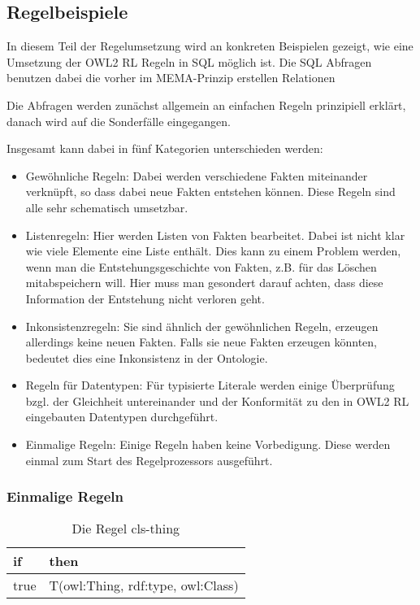 \subsection{Regelbeispiele}
\label{abschnitt-regelbeispiele}
In diesem Teil der Regelumsetzung wird an konkreten Beispielen gezeigt, wie eine Umsetzung der OWL2 RL Regeln in SQL möglich ist. Die SQL Abfragen benutzen dabei die vorher im MEMA-Prinzip erstellen Relationen

Die Abfragen werden zunächst allgemein an einfachen Regeln prinzipiell erklärt, danach wird auf die Sonderfälle eingegangen.

Insgesamt kann dabei in fünf Kategorien unterschieden werden:
\begin{itemize}
  \item Gewöhnliche Regeln: Dabei werden verschiedene Fakten miteinander verknüpft, so dass dabei neue Fakten entstehen können. Diese Regeln sind alle sehr schematisch umsetzbar.
  \item Listenregeln: Hier werden Listen von Fakten bearbeitet. Dabei ist nicht klar wie viele Elemente eine Liste enthält. Dies kann zu einem Problem werden, wenn man die Entstehungsgeschichte von Fakten, z.B. für das Löschen mitabspeichern will. Hier muss man gesondert darauf achten, dass diese Information der Entstehung nicht verloren geht.
  \item Inkonsistenzregeln: Sie sind ähnlich der gewöhnlichen Regeln, erzeugen allerdings keine neuen Fakten. Falls sie neue Fakten erzeugen könnten, bedeutet dies eine Inkonsistenz in der Ontologie.
  \item Regeln für Datentypen: Für typisierte Literale werden einige Überprüfung bzgl. der Gleichheit untereinander und der Konformität zu den in OWL2 RL eingebauten Datentypen durchgeführt.
  \item Einmalige Regeln: Einige Regeln haben keine Vorbedigung. Diese werden einmal zum Start des Regelprozessors ausgeführt.
\end{itemize}

\subsubsection{Einmalige Regeln}

\begin{table}[htb]
\begin{center}
	\begin{tabular}{l|l}
	if & then \\ \hline
	true & T(owl:Thing, rdf:type, owl:Class)
	\end{tabular}
\end{center}
	\caption{Die Regel cls-thing}
	\label{rule-cls-thing}
\end{table}


